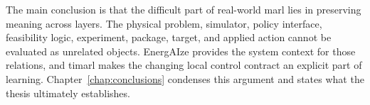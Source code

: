 The main conclusion is that the difficult part of real-world \gls{marl} lies in preserving meaning across layers. The physical problem, simulator, policy interface, feasibility logic, experiment, package, target, and applied action cannot be evaluated as unrelated objects. EnergAIze provides the system context for those relations, and \gls{timarl} makes the changing local control contract an explicit part of learning. Chapter~\ref{chap:conclusions} condenses this argument and states what the thesis ultimately establishes.
